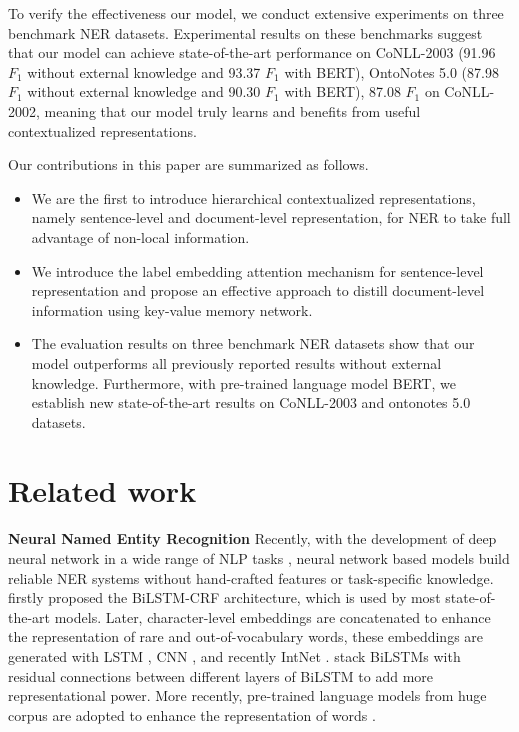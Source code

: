 \documentclass[letterpaper]{article} \usepackage{aaai20}  \usepackage{times}  \usepackage{helvet} \usepackage{courier}  \usepackage[hyphens]{url}  \usepackage{graphicx} \urlstyle{rm} \def\UrlFont{\rm}  \usepackage{graphicx}  \frenchspacing  \setlength{\pdfpagewidth}{8.5in}  \setlength{\pdfpageheight}{11in}
\begin{document}
To verify the effectiveness our model, we conduct extensive experiments on three benchmark NER datasets.
Experimental results on these benchmarks suggest that our model can achieve state-of-the-art performance on CoNLL-2003 (91.96 $F_1$ without external knowledge and 93.37 $F_1$ with BERT), OntoNotes 5.0 (87.98 $F_1$ without external knowledge and 90.30 $F_1$ with BERT), 87.08 $F_1$ on CoNLL-2002, meaning that our model truly learns and benefits from useful contextualized representations.

Our contributions in this paper are summarized as follows.
\begin{itemize}
    \item We are the first to introduce hierarchical contextualized representations, namely sentence-level and document-level representation, for NER to take full advantage of non-local information.
    \item We introduce the label embedding attention mechanism for sentence-level representation and propose an effective approach to distill document-level information using key-value memory network.
    \item The evaluation results on three benchmark NER datasets show that our model outperforms all previously reported results without external knowledge. Furthermore, with pre-trained language model BERT, we establish new state-of-the-art results on CoNLL-2003 and ontonotes 5.0 datasets.
\end{itemize} 

\section{Related work}

\noindent\textbf{Neural Named Entity Recognition} 
Recently, with the development of deep neural network in a wide range of NLP tasks \cite{he2018syntax,he2019syntax,zhou2019head,xiao2019lattice,zhang2019dcmn+,zhang2019semantics}, neural network based models build 
reliable NER systems without hand-crafted features
or task-specific knowledge.
\cite{huang2015bidirectional} firstly proposed the BiLSTM-CRF architecture, which is used by most state-of-the-art models.
Later, character-level embeddings are concatenated to enhance the representation of rare and out-of-vocabulary words, these embeddings are generated with LSTM \cite{lample2016neural}, CNN \cite{ma2016end}, and recently IntNet \cite{xin2018learning}.
\cite{tran-etal-2017-named} stack BiLSTMs with residual connections between different layers of BiLSTM to add more representational
power. 
More recently, pre-trained language models from huge corpus are  adopted to enhance the representation of words \cite{peters2018deep,akbik2019pooled,devlin2018bert}. 
\end{document}
